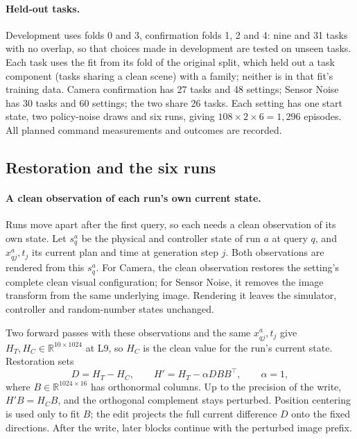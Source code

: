\paragraph{Held-out tasks.}
Development uses folds 0 and 3, confirmation folds 1, 2 and 4: nine and 31 tasks with no overlap, so that choices made in development are tested on unseen tasks. Each task uses the fit from its fold of the original split, which held out a task component (tasks sharing a clean scene) with a family; neither is in that fit's training data. Camera confirmation has 27 tasks and 48 settings; Sensor Noise has 30 tasks and 60 settings; the two share 26 tasks. Each setting has one start state, two policy-noise draws and six runs, giving $108\times2\times6=1{,}296$ episodes. All planned command measurements and outcomes are recorded.

\subsection{Restoration and the six runs}

\paragraph{A clean observation of each run's own current state.}
Runs move apart after the first query, so each needs a clean observation of its own state. Let $s_q^a$ be the physical and controller state of run $a$ at query $q$, and $x_{qj}^a,t_j$ its current plan and time at generation step $j$. Both observations are rendered from this $s_q^a$. For Camera, the clean observation restores the setting's complete clean visual configuration; for Sensor Noise, it removes the image transform from the same underlying image. Rendering it leaves the simulator, controller and random-number states unchanged.

Two forward passes with these observations and the same $x_{qj}^a,t_j$ give $H_T,H_C\in\mathbb R^{10\times1024}$ at L9, so $H_C$ is the clean value for the run's current state. Restoration sets
\begin{equation}
 D=H_T-H_C,\qquad
 H'=H_T-\alpha D B B^\top,\qquad \alpha=1,
 \label{eq:allstep-restoration}
\end{equation}
where $B\in\mathbb R^{1024\times16}$ has orthonormal columns. Up to the precision of the write, $H'B=H_CB$, and the orthogonal complement stays perturbed. Position centering is used only to fit $B$; the edit projects the full current difference $D$ onto the fixed directions. After the write, later blocks continue with the perturbed image prefix.

